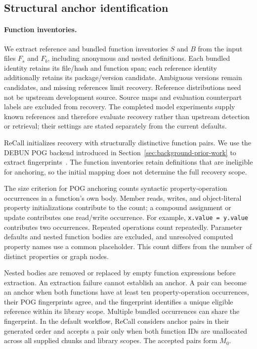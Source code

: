 \subsection{Structural anchor identification}
\label{sec:pog-anchors}

\paragraph{Function inventories.}
We extract reference and bundled function inventories $S$ and $B$ from the input files $F_s$ and $F_b$, including anonymous and nested definitions. Each bundled identity retains its file/hash and function span; each reference identity additionally retains its package/version candidate. Ambiguous versions remain candidates, and missing references limit recovery. Reference distributions need not be upstream development source. Source maps and evaluation counterpart labels are excluded from recovery. The completed model experiments supply known references and therefore evaluate recovery rather than upstream detection or retrieval; their settings are stated separately from the current defaults.

ReCall initializes recovery with structurally distinctive function pairs. We use the DEBUN POG backend introduced in Section~\ref{sec:background-prior-work} to extract fingerprints~\cite{kim2025debun}. The function inventories retain definitions that are ineligible for anchoring, so the initial mapping does not determine the full recovery scope.

The size criterion for POG anchoring counts syntactic property-operation occurrences in a function's own body. Member reads, writes, and object-literal property initializations contribute to the count; a compound assignment or update contributes one read/write occurrence. For example, \texttt{x.value = y.value} contributes two occurrences. Repeated operations count repeatedly. Parameter defaults and nested function bodies are excluded, and unresolved computed property names use a common placeholder. This count differs from the number of distinct properties or graph nodes.

Nested bodies are removed or replaced by empty function expressions before extraction. An extraction failure cannot establish an anchor. A pair can become an anchor when both functions have at least ten property-operation occurrences, their POG fingerprints agree, and the fingerprint identifies a unique eligible reference within its library scope. Multiple bundled occurrences can share the fingerprint. In the default workflow, ReCall considers anchor pairs in their generated order and accepts a pair only when both function IDs are unallocated across all supplied chunks and library scopes. The accepted pairs form $M_0$.

